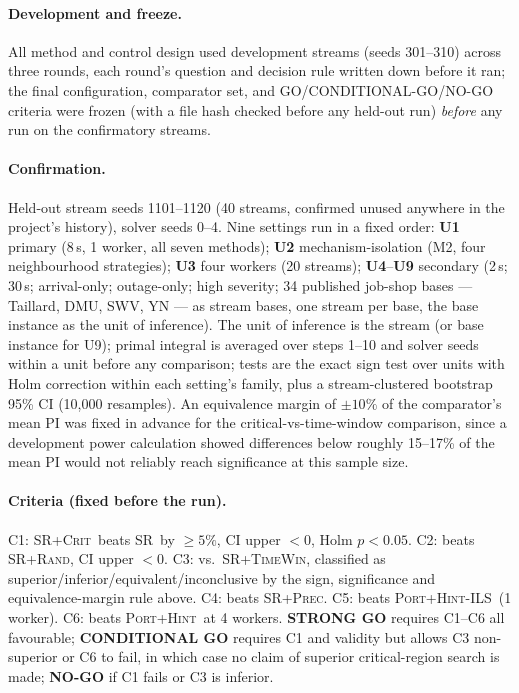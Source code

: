 \documentclass[letterpaper]{article} %
\newcommand{\base}{\textsc{SR}}
\newcommand{\crit}{\textsc{SR+Crit}}
\newcommand{\rnd}{\textsc{SR+Rand}}
\newcommand{\tw}{\textsc{SR+TimeWin}}
\newcommand{\precn}{\textsc{SR+Prec}}
\newcommand{\ph}{\textsc{Port+Hint}}
\newcommand{\native}{\textsc{Port+Hint-ILS}}
\begin{document}
\paragraph{Development and freeze.} All method and control design used development streams (seeds 301--310) across three rounds, each round's question and decision rule written down before it ran; the final configuration, comparator set, and GO/CONDITIONAL-GO/NO-GO criteria were frozen (with a file hash checked before any held-out run) \emph{before} any run on the confirmatory streams.

\paragraph{Confirmation.} Held-out stream seeds 1101--1120 (40 streams, confirmed unused anywhere in the project's history), solver seeds 0--4. Nine settings run in a fixed order: \textbf{U1} primary (8\,s, 1 worker, all seven methods); \textbf{U2} mechanism-isolation (M2, four neighbourhood strategies); \textbf{U3} four workers (20 streams); \textbf{U4}--\textbf{U9} secondary (2\,s; 30\,s; arrival-only; outage-only; high severity; 34 published job-shop bases --- Taillard, DMU, SWV, YN --- as stream bases, one stream per base, the base instance as the unit of inference). The unit of inference is the stream (or base instance for U9); primal integral is averaged over steps 1--10 and solver seeds within a unit before any comparison; tests are the exact sign test over units with Holm correction within each setting's family, plus a stream-clustered bootstrap 95\% CI (10{,}000 resamples). An equivalence margin of $\pm10\%$ of the comparator's mean PI was fixed in advance for the critical-vs-time-window comparison, since a development power calculation showed differences below roughly 15--17\% of the mean PI would not reliably reach significance at this sample size.

\paragraph{Criteria (fixed before the run).} C1: \crit\ beats \base\ by $\ge5\%$, CI upper $<0$, Holm $p<0.05$. C2: beats \rnd, CI upper $<0$. C3: vs.\ \tw, classified as superior/inferior/equivalent/inconclusive by the sign, significance and equivalence-margin rule above. C4: beats \precn. C5: beats \native\ (1 worker). C6: beats \ph\ at 4 workers. \textbf{STRONG GO} requires C1--C6 all favourable; \textbf{CONDITIONAL GO} requires C1 and validity but allows C3 non-superior or C6 to fail, in which case no claim of superior critical-region search is made; \textbf{NO-GO} if C1 fails or C3 is inferior.
\end{document}
